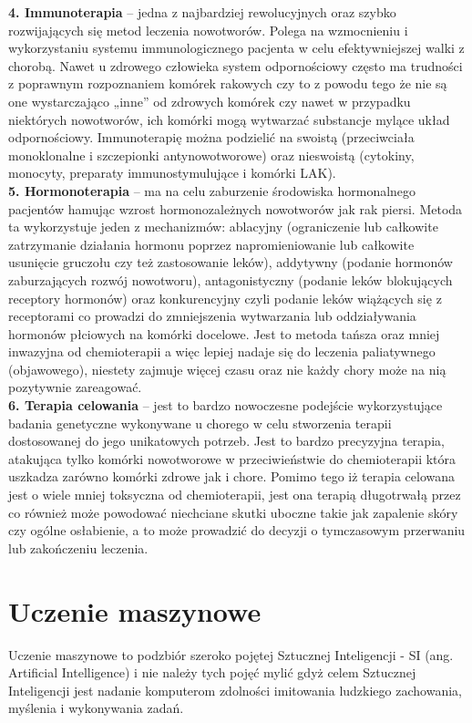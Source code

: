 \documentclass[a4paper,12pt,oneside]{book}
\begin{document}
\textbf{4. Immunoterapia} – jedna z najbardziej rewolucyjnych oraz szybko rozwijających się metod leczenia nowotworów. Polega na wzmocnieniu i wykorzystaniu systemu immunologicznego pacjenta w celu efektywniejszej walki z chorobą. Nawet u zdrowego człowieka system odpornościowy często ma trudności z poprawnym rozpoznaniem komórek rakowych czy to z powodu tego że nie są one wystarczająco „inne” od zdrowych komórek czy nawet w przypadku niektórych nowotworów, ich komórki mogą wytwarzać substancje mylące układ odpornościowy. Immunoterapię można podzielić na swoistą (przeciwciała monoklonalne i szczepionki antynowotworowe) oraz nieswoistą (cytokiny, monocyty, preparaty immunostymulujące i komórki LAK).\\
\textbf{5. Hormonoterapia} – ma na celu zaburzenie środowiska hormonalnego pacjentów hamując wzrost hormonozależnych nowotworów jak rak piersi. Metoda ta wykorzystuje jeden z mechanizmów: ablacyjny (ograniczenie lub całkowite zatrzymanie działania hormonu poprzez napromieniowanie lub całkowite usunięcie gruczołu czy też zastosowanie leków), addytywny (podanie hormonów zaburzających rozwój nowotworu), antagonistyczny (podanie leków blokujących receptory hormonów) oraz konkurencyjny czyli podanie leków wiążących się z receptorami co prowadzi do zmniejszenia wytwarzania lub oddziaływania hormonów płciowych na komórki docelowe. Jest to metoda tańsza oraz mniej inwazyjna od chemioterapii a więc lepiej nadaje się do leczenia paliatywnego (objawowego), niestety zajmuje więcej czasu oraz nie każdy chory może na nią pozytywnie zareagować.\\
\textbf{6. Terapia celowania} – jest to bardzo nowoczesne podejście wykorzystujące badania genetyczne wykonywane u chorego w celu stworzenia terapii dostosowanej do jego unikatowych potrzeb. Jest to bardzo precyzyjna terapia, atakująca tylko komórki nowotworowe w przeciwieństwie do chemioterapii która uszkadza zarówno komórki zdrowe jak i chore. Pomimo tego iż terapia celowana jest o wiele mniej toksyczna od chemioterapii, jest ona terapią długotrwałą przez co również może powodować niechciane skutki uboczne takie jak zapalenie skóry czy ogólne osłabienie, a to może prowadzić do decyzji o tymczasowym przerwaniu lub zakończeniu leczenia.\\





\chapter{Uczenie maszynowe}
Uczenie maszynowe to podzbiór szeroko pojętej Sztucznej Inteligencji - SI (ang. Artificial Intelligence) i nie należy tych pojęć mylić gdyż celem Sztucznej Inteligencji jest nadanie komputerom zdolności  imitowania ludzkiego zachowania, myślenia i wykonywania zadań.\\
\end{document}
